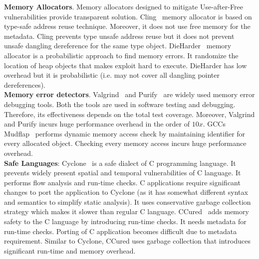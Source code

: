 \textbf{Memory Allocators}.
Memory allocators designed to mitigate Use-after-Free vulnerabilities provide transparent solution. Cling~\cite{akritidis2010cling} memory allocator is based on type-safe address reuse technique. Moreover, it does not use free memory for the metadata. Cling prevents type unsafe address reuse but it does not prevent unsafe dangling dereference for the same type object. DieHarder~\cite{novark2010dieharder} memory allocator is a probabilistic approach to find memory errors. It randomize the location of heap objects that makes exploit hard to execute. DieHarder has low overhead but it is probabilistic (i.e. may not cover all dangling pointer dereferences). \\

\textbf{Memory error detectors}.
Valgrind~\cite{nethercote2007valgrind} and Purify~\cite{hastings1991purify} are widely used memory error debugging tools.  Both the tools are used in software testing and debugging. Therefore, its effectiveness depends on the total test coverage. Moreover, Valgrind and Purify incurs huge performance overhead in the order of $10x$. GCCs Mudflap~\cite{eigler2003mudflap} performs dynamic memory access check by maintaining identifier for every allocated object. Checking every memory access incurs huge performance overhead. \\

\textbf{Safe Languages}:
Cyclone~\cite{jim2002cyclone} is a safe dialect of C programming language. It prevents widely present spatial and temporal vulnerabilities of C language. It performs flow analysis and run-time checks. C applications require significant changes to port the application to Cyclone (as it has somewhat different syntax and semantics to simplify static analysis). It uses conservative garbage collection strategy which makes it slower than regular C language. CCured~\cite{necula2005ccured} adds memory safety to the C language by introducing run-time checks. It needs metadata for run-time checks. Porting of C application becomes difficult due to metadata requirement. Similar to Cyclone, CCured uses garbage collection that introduces significant run-time and memory overhead.  



